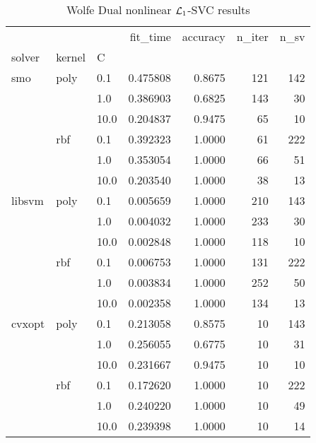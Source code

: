 \begin{table}[H]
\centering
\caption{Wolfe Dual nonlinear $\protect \mathcal{L}_1$-SVC results}
\label{nonlinear_dual_l1_svc_cv_results}
\begin{tabular}{lllrrrr}
\toprule
       &     &      &  fit\_time &  accuracy &  n\_iter &  n\_sv \\
solver & kernel & C &           &           &         &       \\
\midrule
smo & poly & 0.1  &  0.475808 &    0.8675 &     121 &   142 \\
       &     & 1.0  &  0.386903 &    0.6825 &     143 &    30 \\
       &     & 10.0 &  0.204837 &    0.9475 &      65 &    10 \\
       & rbf & 0.1  &  0.392323 &    1.0000 &      61 &   222 \\
       &     & 1.0  &  0.353054 &    1.0000 &      66 &    51 \\
       &     & 10.0 &  0.203540 &    1.0000 &      38 &    13 \\
libsvm & poly & 0.1  &  0.005659 &    1.0000 &     210 &   143 \\
       &     & 1.0  &  0.004032 &    1.0000 &     233 &    30 \\
       &     & 10.0 &  0.002848 &    1.0000 &     118 &    10 \\
       & rbf & 0.1  &  0.006753 &    1.0000 &     131 &   222 \\
       &     & 1.0  &  0.003834 &    1.0000 &     252 &    50 \\
       &     & 10.0 &  0.002358 &    1.0000 &     134 &    13 \\
cvxopt & poly & 0.1  &  0.213058 &    0.8575 &      10 &   143 \\
       &     & 1.0  &  0.256055 &    0.6775 &      10 &    31 \\
       &     & 10.0 &  0.231667 &    0.9475 &      10 &    10 \\
       & rbf & 0.1  &  0.172620 &    1.0000 &      10 &   222 \\
       &     & 1.0  &  0.240220 &    1.0000 &      10 &    49 \\
       &     & 10.0 &  0.239398 &    1.0000 &      10 &    14 \\
\bottomrule
\end{tabular}
\end{table}

